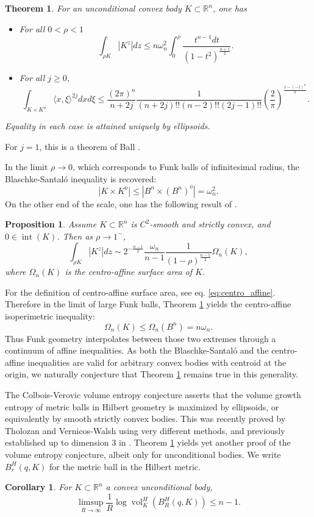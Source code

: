 \documentclass[reqno,10pt]{amsart}
\newcounter{mt}
\newcounter{mc}
\newcounter{mp}
\newtheorem{MainTheorem}[mt]{Theorem}
\newtheorem{MainProposition}[mp]{Proposition}
\newtheorem{MainCorollary}[mc]{Corollary}
\DeclareMathOperator{\inter}{int}
\DeclareMathOperator{\vol}{vol}
\newcommand{\R}{\mathbb{R}}
\begin{document}
\begin{MainTheorem}\label{main:bodies_inequality}
	For an unconditional convex body $K\subset \R^n$, one has
	\begin{itemize}
	\item 	For all $0< \rho<1$
		$$ 	\int_{\rho K} |K^z|dz\leq n\omega_n^2\int_0^\rho\frac{t^{n-1}dt}{(1-t^2)^{\frac{n+1}{2}}}.$$
	\item For all $j\geq 0$,
		$$\int_{K\times K^o}\langle x, \xi\rangle^{2j}dxd\xi\leq \frac{(2\pi)^n}{n+2j}\frac{1}{ (n+2j)!!(n-2)!!(2j-1)!!} \left(\frac2\pi\right)^{\frac{1-(-1)^n}{2} }.$$
		
	\end{itemize}
	Equality in each case is attained uniquely by ellipsoids.
\end{MainTheorem}
\noindent For $j=1$, this is a theorem of Ball \cite{ball_remarks}.

In the limit $\rho\to0$, which corresponds to Funk balls of infinitesimal radius, the Blaschke-Santal\'o inequality is recovered: $$|K\times K^o|\leq |B^n\times (B^n)^o|=\omega_n^2.$$  On the other end of the scale, one has the following result of \cite{berck_bernig_vernicos}.
\begin{MainProposition}\label{prop:centro_affine_main}
	Assume $K\subset\R^n$ is $C^2$-smooth and strictly convex, and $0\in\inter(K)$. Then as $\rho\to 1^{-}$,
	$$\int_{\rho K}|K^z|dz\sim 2^{-\frac{n-1}{2}}\frac{\omega_n}{n-1}\frac{1}{(1-\rho)^{\frac{n-1}{2}}}\Omega_n(K),$$
	where $\Omega_n(K)$ is the centro-affine surface area of $K$.
\end{MainProposition}
For the definition of centro-affine surface area, see eq. \eqref{eq:centro_affine}.
Therefore in the limit of large Funk balls, Theorem \ref{main:bodies_inequality} yields the centro-affine isoperimetric inequality:
$$\Omega_n(K)\leq \Omega_n(B^n)=n\omega_n.$$
Thus Funk geometry interpolates between those two extremes through a continuum of affine inequalities. As both the Blaschke-Santal\'o and the centro-affine inequalities are valid for arbitrary convex bodies with centroid at the origin, we naturally conjecture that Theorem \ref{main:bodies_inequality} remains true in this generality. 

The Colbois-Verovic volume entropy conjecture \cite{colbois_verovic} asserts that the volume growth entropy of metric balls in Hilbert geometry is maximized by ellipsoids, or equivalently by smooth strictly convex bodies. This was recently proved by Tholozan \cite{tholozan} and Vernicos-Walsh \cite{vernicos_walsh} using very different methods, and previously established up to dimension $3$ in \cite{vernicos3d}. 
Theorem \ref{main:bodies_inequality} yields yet another proof of the volume entropy conjecture, albeit only for unconditional bodies. We write $B^H_r(q,K)$ for the metric ball in the Hilbert metric.
\begin{MainCorollary}\label{cor:entropy}
	For $K\subset \R^n$ a convex unconditional body,
		$$\limsup_{R\to \infty}\frac{1}{R}\log \vol_K^H (B^H_R(q,K))\leq n-1.$$
\end{MainCorollary}
\end{document}
